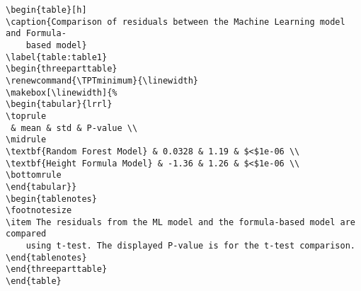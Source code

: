 \documentclass[11pt]{article}
\begin{document}
\begin{Verbatim}[tabsize=4]
\begin{table}[h]
\caption{Comparison of residuals between the Machine Learning model and Formula-
	based model}
\label{table:table1}
\begin{threeparttable}
\renewcommand{\TPTminimum}{\linewidth}
\makebox[\linewidth]{%
\begin{tabular}{lrrl}
\toprule
 & mean & std & P-value \\
\midrule
\textbf{Random Forest Model} & 0.0328 & 1.19 & $<$1e-06 \\
\textbf{Height Formula Model} & -1.36 & 1.26 & $<$1e-06 \\
\bottomrule
\end{tabular}}
\begin{tablenotes}
\footnotesize
\item The residuals from the ML model and the formula-based model are compared
	using t-test. The displayed P-value is for the t-test comparison.
\end{tablenotes}
\end{threeparttable}
\end{table}

\end{Verbatim}
\end{document}
